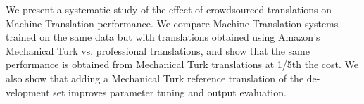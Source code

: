 We present a systematic study of the effect of crowdsourced translations on Machine Translation performance. We compare Machine Translation systems trained
 on the same data but with translations obtained using Amazon's Mechanical
 Turk vs. professional translations, and show that the same performance is
 obtained from Mechanical Turk translations at 1/5th the cost. We also show that
 adding a Mechanical Turk reference translation of the de- velopment set
 improves parameter tuning and output evaluation.

